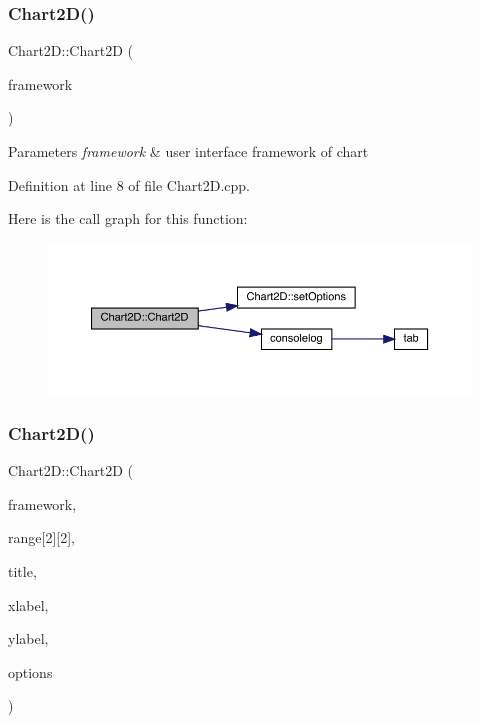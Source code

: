\subsubsection{\texorpdfstring{Chart2\+D()}{Chart2D()}\hspace{0.1cm}{\footnotesize\ttfamily [1/2]}}
{\footnotesize\ttfamily Chart2\+D\+::\+Chart2D (\begin{DoxyParamCaption}\item[{Q\+Widget $\ast$}]{framework }\end{DoxyParamCaption})}


\begin{DoxyParams}{Parameters}
{\em framework} & user interface framework of chart \\
\hline
\end{DoxyParams}


Definition at line 8 of file Chart2\+D.\+cpp.

Here is the call graph for this function\+:
\nopagebreak
\begin{figure}[H]
\begin{center}
\leavevmode
\includegraphics[width=350pt]{class_chart2_d_a6883ce065d3a6a52f6f72efdf35d62aa_cgraph}
\end{center}
\end{figure}
\mbox{\label{class_chart2_d_a4d29e59bc8eafa3267c62034b51725b4}} 
\subsubsection{\texorpdfstring{Chart2\+D()}{Chart2D()}\hspace{0.1cm}{\footnotesize\ttfamily [2/2]}}
{\footnotesize\ttfamily Chart2\+D\+::\+Chart2D (\begin{DoxyParamCaption}\item[{Q\+Widget $\ast$}]{framework,  }\item[{double}]{range\mbox{[}2\mbox{]}\mbox{[}2\mbox{]},  }\item[{std\+::string}]{title,  }\item[{std\+::string}]{xlabel,  }\item[{std\+::string}]{ylabel,  }\item[{int}]{options }\end{DoxyParamCaption})}


